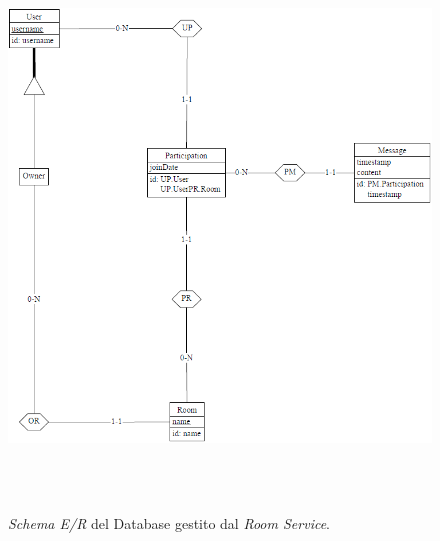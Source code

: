 \begin{figure}
    \centering
  \includegraphics[height=15cm, width=12cm,
		keepaspectratio]{images/RoomServiceER.PNG}
  \caption{\textit{Schema E/R} del Database gestito dal \textit{Room Service}.}
  \label{fig:room-service-er-schema}
\end{figure}
